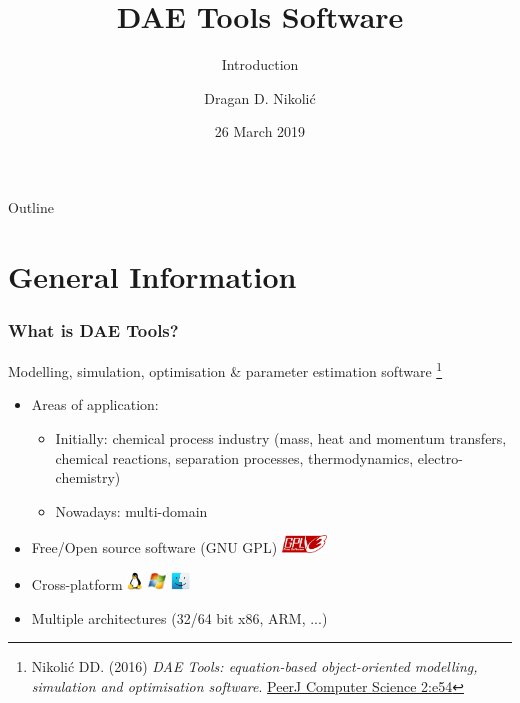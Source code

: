 \documentclass[compress,newPxFont,sthlmFooter]{beamer}
\title{DAE Tools Software}
\subtitle{Introduction}
\author{Dragan D. Nikolić}
\institute
{
  DAE Tools Project, \url{http://www.daetools.com}
}
\date{26 March 2019}
\begin{document}
\maketitle

\begin{frame}{Outline}
\tableofcontents[sectionstyle=show, 
                 subsectionstyle=hide]
\end{frame} 

\section{General Information}

\begin{frame}
\frametitle{What is DAE Tools?} 
\alert{Modelling}, \alert{simulation}, \alert{optimisation} \& \alert{parameter estimation} software
\footnote{\tiny{Nikolić DD. (2016) \textit{DAE Tools: equation-based object-oriented modelling, simulation and optimisation software}.
          \href{https://doi.org/10.7717/peerj-cs.54}{PeerJ Computer Science 2:e54}}
         }

\begin{itemize}
  \item Areas of application:
    \begin{itemize}
      \item Initially: \alert{chemical process industry} (mass, heat and momentum transfers, chemical reactions, 
                                                          separation processes, thermodynamics, electro-chemistry)
      \item Nowadays: \alert{multi-domain}
    \end{itemize}
  \item \alert{Free/Open source software} (GNU GPL) \includegraphics[align=c,height=1.3em]{gnu_gpl3.png}
  \item \alert{Cross-platform} \includegraphics[align=c,height=1.3em]{linux.png} 
                               \includegraphics[align=c,height=1.3em]{windows.png} 
                               \includegraphics[align=c,height=1.3em]{macos.png}
  \item \alert{Multiple architectures} (32/64 bit x86, ARM, ...)
\end{itemize}
\end{frame}
\end{document}
